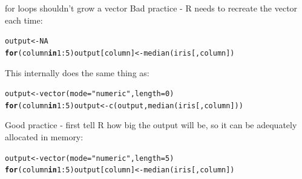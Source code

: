 \documentclass[xcolor=table,      handout ,    xcolor=dvipsnames]{beamer}\usepackage[]{graphicx}\usepackage[]{color}
\makeatletter
\newcommand{\hlnum}[1]{\textcolor[rgb]{0,0,0}{#1}}
\newcommand{\hlstr}[1]{\textcolor[rgb]{0.545,0.137,0.137}{#1}}
\newcommand{\hlopt}[1]{\textcolor[rgb]{0,0,0}{#1}}
\newcommand{\hlstd}[1]{\textcolor[rgb]{0,0,0}{#1}}
\newcommand{\hlkwa}[1]{\textcolor[rgb]{1,0,0}{\textbf{#1}}}
\newcommand{\hlkwb}[1]{\textcolor[rgb]{0,0,0}{#1}}
\newcommand{\hlkwc}[1]{\textcolor[rgb]{1,0,1}{#1}}
\newcommand{\hlkwd}[1]{\textcolor[rgb]{0,0,1}{#1}}
\newenvironment{kframe}{%
 \def\at@end@of@kframe{}%
 \ifinner\ifhmode%
  \def\at@end@of@kframe{\end{minipage}}%
  \begin{minipage}{\columnwidth}%
 \fi\fi%
 \def\FrameCommand##1{\hskip\@totalleftmargin \hskip-\fboxsep
 \colorbox{shadecolor}{##1}\hskip-\fboxsep
     \hskip-\linewidth \hskip-\@totalleftmargin \hskip\columnwidth}%
 \MakeFramed {\advance\hsize-\width
   \@totalleftmargin\z@ \linewidth\hsize
   \@setminipage}}%
 {\par\unskip\endMakeFramed%
 \at@end@of@kframe}
\newenvironment{knitrout}{}{} %
\makeatother
\begin{document}

\begin{frame}[fragile]{for loops shouldn't grow a vector}
Bad practice - R needs to recreate the vector each time:
\begin{knitrout}\small
{}\color{fgcolor}\begin{kframe}
\begin{alltt}
\hlstd{output} \hlkwb{<-} \hlnum{NA}
\hlkwa{for}\hlstd{(column} \hlkwa{in} \hlnum{1}\hlopt{:}\hlnum{5}\hlstd{) output[column]} \hlkwb{<-} \hlkwd{median}\hlstd{(iris[ ,column])}
\end{alltt}
\end{kframe}
\end{knitrout}
\pause
This internally does the same thing as:
\begin{knitrout}\small
{}\color{fgcolor}\begin{kframe}
\begin{alltt}
\hlstd{output} \hlkwb{<-} \hlkwd{vector}\hlstd{(}\hlkwc{mode}\hlstd{=}\hlstr{"numeric"}\hlstd{,} \hlkwc{length}\hlstd{=}\hlnum{0}\hlstd{)}
\hlkwa{for}\hlstd{(column} \hlkwa{in} \hlnum{1}\hlopt{:}\hlnum{5}\hlstd{) output} \hlkwb{<-} \hlkwd{c}\hlstd{(output,} \hlkwd{median}\hlstd{(iris[ ,column])  )}
\end{alltt}
\end{kframe}
\end{knitrout}
\pause
Good practice - first tell R how big the output will be, so it can be adequately allocated in memory:
\begin{knitrout}\small
{}\color{fgcolor}\begin{kframe}
\begin{alltt}
\hlstd{output} \hlkwb{<-} \hlkwd{vector}\hlstd{(}\hlkwc{mode}\hlstd{=}\hlstr{"numeric"}\hlstd{,} \hlkwc{length}\hlstd{=}\hlnum{5}\hlstd{)}
\hlkwa{for}\hlstd{(column} \hlkwa{in} \hlnum{1}\hlopt{:}\hlnum{5}\hlstd{) output[column]} \hlkwb{<-} \hlkwd{median}\hlstd{(iris[ ,column])}
\end{alltt}
\end{kframe}
\end{knitrout}
\end{frame}

\end{document}
